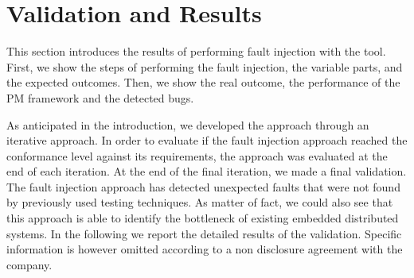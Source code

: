 \section{Validation and Results}\label{sec:results}
This section introduces the results of performing fault injection with the \approach{} %
tool. First, we show the steps of performing the fault injection, the variable parts, and the expected outcomes. Then, we show the real outcome, the performance of the PM framework and the detected bugs.



As anticipated in the introduction, we developed the approach through an iterative approach. In order to evaluate if the fault injection approach reached the conformance level against its requirements, the approach was evaluated at the end of each iteration. 
At the end of the final iteration, we made a final validation. 
The fault injection approach has detected unexpected faults that were not found by previously used testing techniques. As matter of fact, we could also see that this approach is able to identify the bottleneck of existing embedded distributed systems.  In the following we report the detailed results of the validation. Specific information is however omitted according to a non disclosure agreement with the company.


